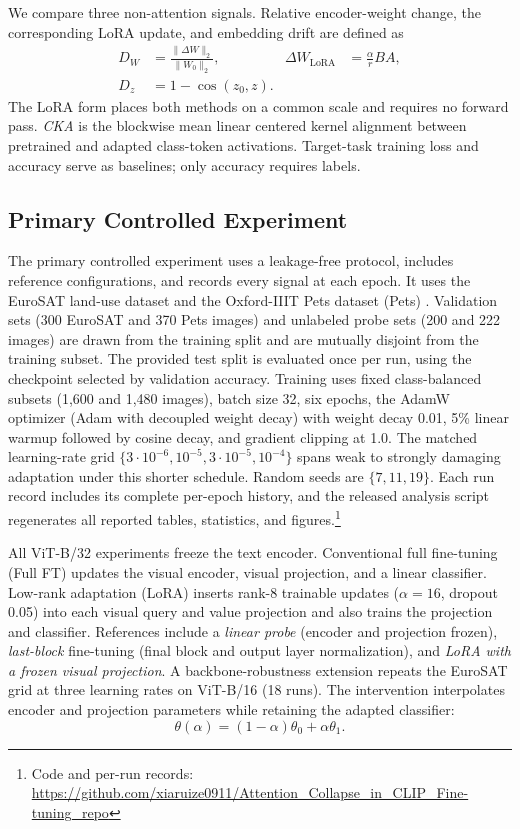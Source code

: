 \documentclass[conference]{IEEEtran}
\begin{document}
We compare three non-attention signals. Relative encoder-weight change, the corresponding LoRA update, and embedding drift are defined as
\begin{align}
D_W &= \frac{\lVert\Delta W\rVert_2}{\lVert W_0\rVert_2},
& \Delta W_{\mathrm{LoRA}} &= \frac{\alpha}{r}BA, \\
D_z &= 1-\cos(z_0,z).
\end{align}
The LoRA form places both methods on a common scale and requires no forward pass. \emph{CKA} is the blockwise mean linear centered kernel alignment \cite{kornblith2019similarity} between pretrained and adapted class-token activations. Target-task training loss and accuracy serve as baselines; only accuracy requires labels.

\subsection{Primary Controlled Experiment}
The primary controlled experiment uses a leakage-free protocol, includes reference configurations, and records every signal at each epoch. It uses the EuroSAT land-use dataset \cite{helber2019eurosat} and the Oxford-IIIT Pets dataset (Pets) \cite{parkhi2012cats}. Validation sets (300 EuroSAT and 370 Pets images) and unlabeled probe sets (200 and 222 images) are drawn from the training split and are mutually disjoint from the training subset. The provided test split is evaluated once per run, using the checkpoint selected by validation accuracy. Training uses fixed class-balanced subsets (1{,}600 and 1{,}480 images), batch size 32, six epochs, the AdamW optimizer (Adam with decoupled weight decay) with weight decay 0.01, 5\% linear warmup followed by cosine decay, and gradient clipping at 1.0. The matched learning-rate grid $\{3\cdot 10^{-6},10^{-5},3\cdot 10^{-5},10^{-4}\}$ spans weak to strongly damaging adaptation under this shorter schedule. Random seeds are $\{7,11,19\}$. Each run record includes its complete per-epoch history, and the released analysis script regenerates all reported tables, statistics, and figures.\footnote{Code and per-run records: \url{https://github.com/xiaruize0911/Attention_Collapse_in_CLIP_Fine-tuning_repo}}

All ViT-B/32 experiments freeze the text encoder. Conventional full fine-tuning (Full FT) updates the visual encoder, visual projection, and a linear classifier. Low-rank adaptation (LoRA) inserts rank-8 trainable updates ($\alpha=16$, dropout 0.05) into each visual query and value projection and also trains the projection and classifier. References include a \emph{linear probe} (encoder and projection frozen), \emph{last-block} fine-tuning (final block and output layer normalization), and \emph{LoRA with a frozen visual projection}. A backbone-robustness extension repeats the EuroSAT grid at three learning rates on ViT-B/16 (18 runs). The intervention interpolates encoder and projection parameters while retaining the adapted classifier:
\begin{equation}
\theta(\alpha)=(1-\alpha)\theta_0+\alpha\theta_1.
\end{equation}
\end{document}
